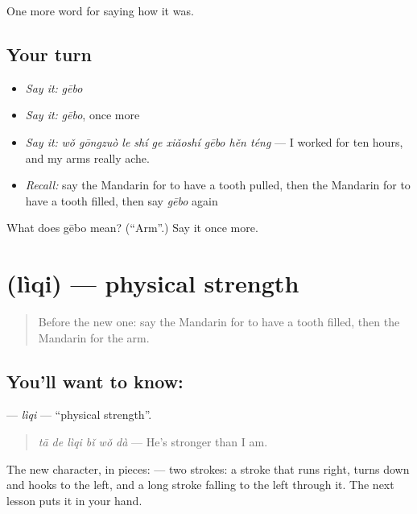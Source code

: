 \begin{grammarlens}[title={What you've built}]
One more word for saying how it was.
\end{grammarlens}

\subsection*{Your turn}
\begin{itemize}
\raggedright
  \item \emph{Say it:} \emph{gēbo}
  \item \emph{Say it:} \emph{gēbo}, once more
  \item \emph{Say it:} \emph{wǒ gōngzuò le shí ge xiǎoshí gēbo hěn téng} — I worked for ten hours, and my arms really ache.
  \item \emph{Recall:} say the Mandarin for to have a tooth pulled, then the Mandarin for to have a tooth filled, then say \emph{gēbo} again
\end{itemize}

\begin{tcolorbox}[breakable,colback=teal!4,colframe=teal!35!black,title={Before you move on}]
What does gēbo mean? (\textquotedblleft{}Arm\textquotedblright{}.) Say it once more.
\end{tcolorbox}
\section[\texorpdfstring{\zh{力气} (lìqi)}{力气 (lìqi)}]{ (lìqi) — physical strength}

\label{lesson:ZH-C474-liqi}



\begin{quote}
Before the new one: say the Mandarin for to have a tooth filled, then the Mandarin for the arm.
\end{quote}

\subsection*{You'll want to know: }
\textbf{} — \emph{lìqi} — \textquotedblleft{}physical strength\textquotedblright{}.

\begin{quote}
\textbf{} \emph{tā de lìqi bǐ wǒ dà} — He's stronger than I am.
\end{quote}

The new character, in pieces:  — two strokes: a stroke that runs right, turns down and hooks to the left, and a long stroke falling to the left through it. The next lesson puts it in your hand.

